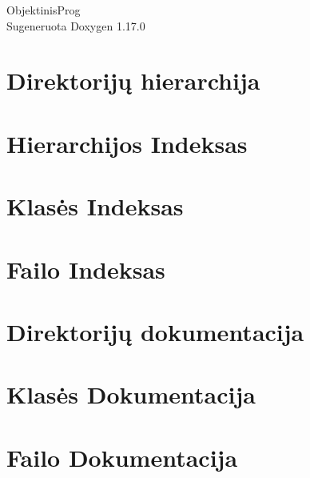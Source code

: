 \documentclass[twoside]{book}
\newcommand{\+}{\discretionary{\mbox{\scriptsize$\hookleftarrow$}}{}{}}
\newcommand{\clearemptydoublepage}{%
    \newpage{\pagestyle{empty}\cleardoublepage}%
  }
\begin{document}
  \raggedbottom
    \hypersetup{pageanchor=false,
                bookmarksnumbered=true,
                pdfencoding=unicode
               }
  \begin{titlepage}
  \vspace*{7cm}
  \begin{center}%
  {\Large Objektinis\+Prog}\\
  \vspace*{1cm}
  {\large Sugeneruota Doxygen 1.17.0}\\
  \end{center}
  \end{titlepage}
  \clearemptydoublepage
  \tableofcontents
  \clearemptydoublepage
  \hypersetup{pageanchor=true}

\chapter{Direktorijų hierarchija}

\chapter{Hierarchijos Indeksas}

\chapter{Klasės Indeksas}

\chapter{Failo Indeksas}

\chapter{Direktorijų dokumentacija}


\chapter{Klasės Dokumentacija}



\chapter{Failo Dokumentacija}











  \backmatter
  \newpage
  \clearemptydoublepage
  \printindex
\end{document}
